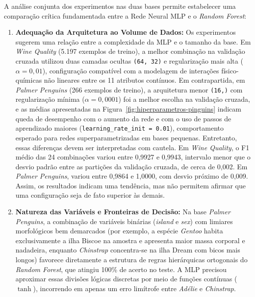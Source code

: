 \documentclass[12pt, oneside, a4paper, english, brazilian]{abntex2}
\begin{document}
A análise conjunta dos experimentos nas duas bases permite estabelecer uma comparação crítica fundamentada entre a Rede Neural MLP e o \textit{Random Forest}:
\begin{enumerate}
  \item \textbf{Adequação da Arquitetura ao Volume de Dados:} Os experimentos sugerem uma relação entre a complexidade da MLP e o tamanho da base. Em \textit{Wine Quality} (5.197 exemplos de treino), a melhor combinação na validação cruzada utilizou duas camadas ocultas \texttt{(64, 32)} e regularização mais alta ($\alpha = 0{,}01$), configuração compatível com a modelagem de interações físico-químicas não lineares entre os 11 atributos contínuos. Em contrapartida, em \textit{Palmer Penguins} (266 exemplos de treino), a arquitetura menor \texttt{(16,)} com regularização mínima ($\alpha = 0{,}0001$) foi a melhor escolha na validação cruzada, e as médias apresentadas na Figura~\ref{fig:hiperparametros-pinguins} indicam queda de desempenho com o aumento da rede e com o uso de passos de aprendizado maiores (\texttt{learning\_rate\_init = 0.01}), comportamento esperado para redes superparametrizadas em bases pequenas. Entretanto, essas diferenças devem ser interpretadas com cautela. Em \textit{Wine Quality}, o F1 médio das 24 combinações variou entre 0,9927 e 0,9943, intervalo menor que o desvio padrão entre as partições da validação cruzada, de cerca de 0,002. Em \textit{Palmer Penguins}, variou entre 0,9864 e 1,0000, com desvio próximo de 0,009. Assim, os resultados indicam uma tendência, mas não permitem afirmar que uma configuração seja de fato superior às demais.
  \item \textbf{Natureza das Variáveis e Fronteiras de Decisão:} Na base \textit{Palmer Penguins}, a combinação de variáveis binárias (\textit{island} e \textit{sex}) com limiares morfológicos bem demarcados (por exemplo, a espécie \textit{Gentoo} habita exclusivamente a ilha Biscoe na amostra e apresenta maior massa corporal e nadadeira, enquanto \textit{Chinstrap} concentra-se na ilha Dream com bicos mais longos) favorece diretamente a estrutura de regras hierárquicas ortogonais do \textit{Random Forest}, que atingiu 100\% de acerto no teste. A MLP precisou aproximar essas divisões lógicas discretas por meio de funções contínuas ($\tanh$), incorrendo em apenas um erro limítrofe entre \textit{Adélie} e \textit{Chinstrap}.

\end{enumerate}
\end{document}
